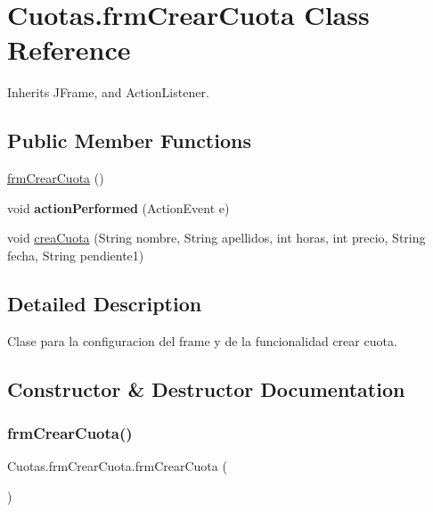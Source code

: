 \hypertarget{class_cuotas_1_1frm_crear_cuota}{}\section{Cuotas.\+frm\+Crear\+Cuota Class Reference}
\label{class_cuotas_1_1frm_crear_cuota}


Inherits J\+Frame, and Action\+Listener.

\subsection*{Public Member Functions}
\begin{DoxyCompactItemize}
\item 
\hyperlink{class_cuotas_1_1frm_crear_cuota_a49978b468cbe572ea4629b84da8db0a4}{frm\+Crear\+Cuota} ()
\item 
\mbox{\label{class_cuotas_1_1frm_crear_cuota_a0fbf90360a00630f5fb252936b227ae7}} 
void {\bfseries action\+Performed} (Action\+Event e)
\item 
void \hyperlink{class_cuotas_1_1frm_crear_cuota_ad3c7bc778a21ffc8d1bdc7af6d778a26}{crea\+Cuota} (String nombre, String apellidos, int horas, int precio, String fecha, String pendiente1)
\end{DoxyCompactItemize}


\subsection{Detailed Description}
Clase para la configuracion del frame y de la funcionalidad crear cuota. 

\subsection{Constructor \& Destructor Documentation}
\mbox{\label{class_cuotas_1_1frm_crear_cuota_a49978b468cbe572ea4629b84da8db0a4}} 
\subsubsection{\texorpdfstring{frm\+Crear\+Cuota()}{frmCrearCuota()}}
{\footnotesize\ttfamily Cuotas.\+frm\+Crear\+Cuota.\+frm\+Crear\+Cuota (\begin{DoxyParamCaption}{ }\end{DoxyParamCaption})}

